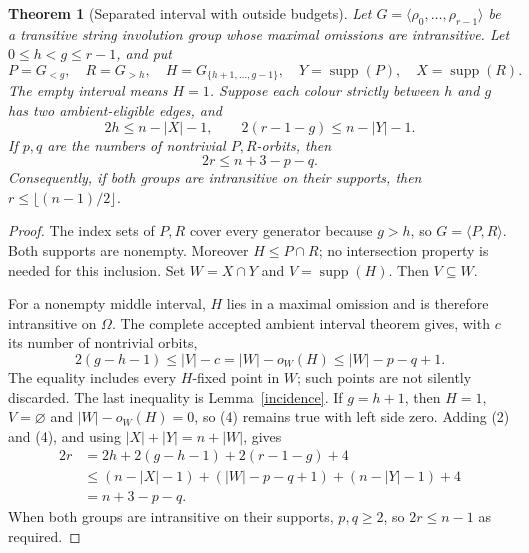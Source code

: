 \documentclass[11pt,a4paper]{article}
\newtheorem{theorem}[lemma]{Theorem}
\newcommand{\gen}[1]{\langle#1\rangle}
\begin{document}
\begin{theorem}[Separated interval with outside budgets]\label{deficit}
Let $G=\gen{\rho_0,\ldots,\rho_{r-1}}$ be a transitive string
involution group whose maximal omissions are intransitive.
Let $0\leq h<g\leq r-1$, and put
\[
 P=G_{<g},\quad R=G_{>h},\quad H=G_{\{h+1,\ldots,g-1\}},
 \quad Y=\operatorname{supp}(P),\quad X=\operatorname{supp}(R).
\]
The empty interval means $H=1$. Suppose each colour strictly
between $h$ and $g$ has two ambient-eligible edges, and
\[
 2h\leq n-|X|-1,\qquad 2(r-1-g)\leq n-|Y|-1.             \tag{2}
\]
If $p,q$ are the numbers of nontrivial $P,R$-orbits, then
\[
                         2r\leq n+3-p-q.                \tag{3}
\]
Consequently, if both groups are intransitive on their supports,
then $r\leq\lfloor(n-1)/2\rfloor$.
\end{theorem}
\begin{proof}
The index sets of $P,R$ cover every generator because $g>h$,
so $G=\gen{P,R}$. Both supports are nonempty. Moreover
$H\leq P\cap R$; no intersection property is needed for this
inclusion. Set $W=X\cap Y$ and $V=\operatorname{supp}(H)$.
Then $V\subseteq W$.

For a nonempty middle interval, $H$ lies in a maximal omission
and is therefore intransitive on $\Omega$. The complete accepted
ambient interval theorem gives, with $c$ its number of nontrivial
orbits,
\[
 2(g-h-1)\leq |V|-c=|W|-o_W(H)\leq |W|-p-q+1.           \tag{4}
\]
The equality includes every $H$-fixed point in $W$; such points
are not silently discarded. The last inequality is Lemma~\ref{incidence}.
If $g=h+1$, then $H=1$, $V=\varnothing$ and
$|W|-o_W(H)=0$, so (4) remains true with left side zero.
Adding (2) and (4), and using $|X|+|Y|=n+|W|$, gives
\[
\begin{split}
2r&=2h+2(g-h-1)+2(r-1-g)+4\\
&\leq (n-|X|-1)+(|W|-p-q+1)+(n-|Y|-1)+4\\
&=n+3-p-q.
\end{split}
\]
When both groups are intransitive on their supports, $p,q\geq2$,
so $2r\leq n-1$ as required.
\end{proof}
\end{document}
